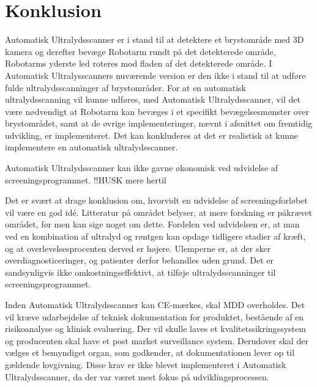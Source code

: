 \chapter{Konklusion}\label{kapitel_Konklusion}
Automatisk Ultralydsscanner er i stand til at detektere et brystområde med 3D kamera og derefter bevæge Robotarm rundt på det detekterede område, Robotarms yderste led roteres mod fladen af det detekterede område. I Automatisk Ultralysscanners nuværende version er den ikke i stand til at udføre fulde ultralydsscanninger af brystområder. For at en automatisk ultralydsscanning vil kunne udføres, med Automatisk Ultralydsscanner, vil det være nødvendigt at Robotarm kan bevæges i et specifikt bevægelsesmønster over brystområdet, samt at de øvrige implementeringer, nævnt i afsnittet om fremtidig udvikling, er implementeret. Det kan konkluderes at det er realistisk at kunne implementere en automatisk ultralydsscanner. 

Automatisk Ultralydsscanner kan ikke gavne økonomisk ved udvidelse af screeningsprogrammet. !!HUSK mere hertil %

Det er svært at drage konklusion om, hvorvidt en udvidelse af screeningsforløbet vil være en god idé. Litteratur på området belyser, at mere forskning er påkrævet området, før men kan sige noget om dette. Fordelen ved udvidelsen er, at man ved en kombination af ultralyd og røntgen kan opdage tidligere stadier af kræft, og at overlevelsesprocenten  derved er højere. Ulemperne er, at der sker overdiagnosticeringer, og patienter derfor behandles uden grund.  Det er sandsynligvis ikke omkostningseffektivt, at tilføje ultralydsscanninger til screeningsprogrammet. 

Inden Automatisk Ultralydsscanner kan CE-mærkes, skal MDD overholdes. Det vil kræve udarbejdelse af teknisk dokumentation for produktet, bestående af en risikoanalyse og klinisk evaluering. Der vil skulle laves et kvalitetssikringssystem og producenten skal have et post market surveillance system. Derudover skal der vælges et bemyndiget organ, som godkender, at dokumentationen lever op til gældende lovgivning. Disse krav er ikke blevet implementeret i Automatisk Ultralydsscanner, da der var været mest fokus på udviklingsprocessen. 
